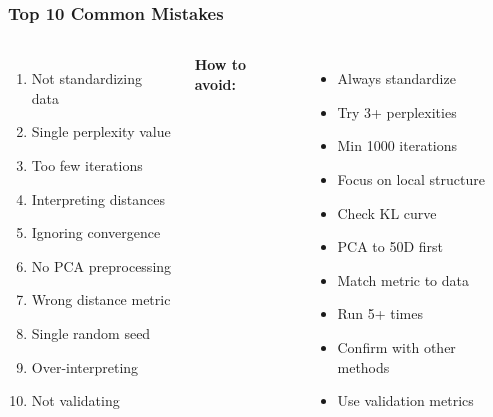 \documentclass[aspectratio=169]{beamer}
\begin{document}
\begin{frame}
\frametitle{Top 10 Common Mistakes}
\begin{columns}[T]
\begin{enumerate}
\small
\item Not standardizing data
\item Single perplexity value
\item Too few iterations
\item Interpreting distances
\item Ignoring convergence
\item No PCA preprocessing
\item Wrong distance metric
\item Single random seed
\item Over-interpreting
\item Not validating
\end{enumerate}

\textbf{How to avoid:}
\begin{itemize}
\small
\item Always standardize
\item Try 3+ perplexities
\item Min 1000 iterations
\item Focus on local structure
\item Check KL curve
\item PCA to 50D first
\item Match metric to data
\item Run 5+ times
\item Confirm with other methods
\item Use validation metrics
\end{itemize}
\end{columns}
\end{frame}
\end{document}
